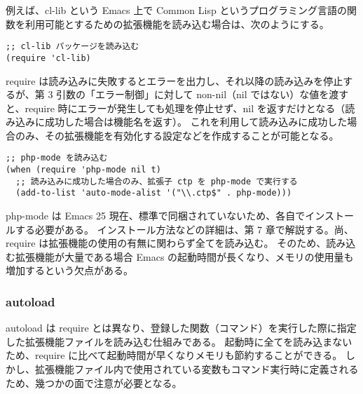 例えば、cl-lib という Emacs 上で Common Lisp というプログラミング言語の関数を利用可能とするための拡張機能を読み込む場合は、次のようにする。
\begin{mdframed}[roundcorner=0.50zw,leftmargin=3.00zw,rightmargin=3.00zw,skipabove=0.40zw,skipbelow=0.40zw,innertopmargin=4.00pt,innerbottommargin=4.00pt,innerleftmargin=5.00pt,innerrightmargin=5.00pt,linecolor=gray!020,linewidth=0.50pt,backgroundcolor=gray!20]
\begin{verbatim}
;; cl-lib パッケージを読み込む
(require 'cl-lib)
\end{verbatim}
\end{mdframed}
require は読み込みに失敗するとエラーを出力し、それ以降の読み込みを停止するが、第 3 引数の「エラー制御」に対して non-nil（nil ではない）な値を渡すと、require 時にエラーが発生しても処理を停止せず、nil を返すだけとなる（読み込みに成功した場合は機能名を返す）。
これを利用して読み込みに成功した場合のみ、その拡張機能を有効化する設定などを作成することが可能となる。
\begin{mdframed}[roundcorner=0.50zw,leftmargin=3.00zw,rightmargin=3.00zw,skipabove=0.40zw,skipbelow=0.40zw,innertopmargin=4.00pt,innerbottommargin=4.00pt,innerleftmargin=5.00pt,innerrightmargin=5.00pt,linecolor=gray!020,linewidth=0.50pt,backgroundcolor=gray!20]
\begin{verbatim}
;; php-mode を読み込む
(when (require 'php-mode nil t)
  ;; 読み込みに成功した場合のみ、拡張子 ctp を php-mode で実行する
  (add-to-list 'auto-mode-alist '("\\.ctp$" . php-mode)))
\end{verbatim}
\end{mdframed}
php-mode は Emacs 25 現在、標準で同梱されていないため、各自でインストールする必要がある。
インストール方法などの詳細は、第 7 章で解説する。尚、require は拡張機能の使用の有無に関わらず全てを読み込む。
そのため、読み込む拡張機能が大量である場合 Emacs の起動時間が長くなり、メモリの使用量も増加するという欠点がある。
\subsubsection{autoload}
autoload は require とは異なり、登録した関数（コマンド）を実行した際に指定した拡張機能ファイルを読み込む仕組みである。
起動時に全てを読み込まないため、require に比べて起動時間が早くなりメモリも節約することができる。
しかし、拡張機能ファイル内で使用されている変数もコマンド実行時に定義されるため、幾つかの面で注意が必要となる。\\


